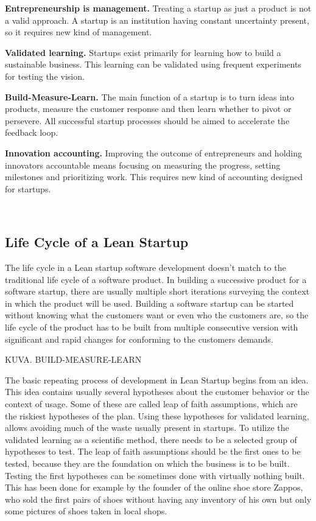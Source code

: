 \textbf{Entrepreneurship is management.} Treating a startup as just a product is not a valid approach. A startup is an institution having constant uncertainty present, so it requires new kind of management.

\textbf{Validated learning.} Startups exist primarily for learning how to build a sustainable business. This learning can be validated using frequent experiments for testing the vision.

\textbf{Build-Measure-Learn.} The main function of a startup is to turn ideas into products, measure the customer response and then learn whether to pivot or persevere. All successful startup processes should be aimed to accelerate the feedback loop.

\textbf{Innovation accounting.} Improving the outcome of entrepreneurs and holding innovators accountable means focusing on measuring the progress, setting milestones and prioritizing work. This requires new kind of accounting designed for startups.


~\cite{ries2011lean}

 \subsection{Life Cycle of a Lean Startup}
 
 The life cycle in a Lean startup software development doesn't match to the traditional life cycle of a software product. In building a successive product for a software startup, there are usually multiple short iterations surveying the context in which the product will be used. Building a software startup can be started without knowing what the customers want or even who the customers are, so the life cycle of the product has to be built from multiple consecutive version with significant and rapid changes for conforming to the customers demands.

KUVA. BUILD-MEASURE-LEARN

The basic repeating process of development in Lean Startup begins from an idea. This idea contains usually several hypotheses about the customer behavior or the context of usage. Some of these are called leap of faith assumptions, which are the riskiest hypotheses of the plan. Using these hypotheses for validated learning, allows avoiding much of the waste usually present in startups. To utilize the validated learning as a scientific method, there needs to be a selected group of hypotheses to test. The leap of faith assumptions should be the first ones to be tested, because they are the foundation on which the business is to be built. Testing the first hypotheses can be sometimes done with virtually nothing built. This has been done for example by the founder of the online shoe store Zappos, who sold the first pairs of shoes without having any inventory of his own but only some pictures of shoes taken in local shops.

